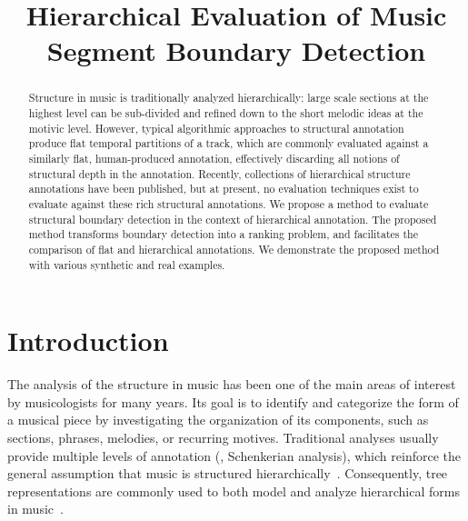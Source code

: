 \documentclass{article}
\title{Hierarchical Evaluation of Music Segment Boundary Detection}
\begin{document}
%
\maketitle
%
\begin{abstract}
Structure in music is traditionally analyzed hierarchically: large scale sections at the highest level can be sub-divided and refined down to the short melodic ideas at the motivic level. 
However, typical algorithmic approaches to structural annotation produce flat temporal partitions of a track, which are commonly evaluated against a similarly flat, human-produced
annotation, effectively discarding all notions of structural depth in the annotation.
Recently, collections of hierarchical structure annotations have been published, but at present, no evaluation techniques exist to evaluate against these rich structural annotations.
We propose a method to evaluate structural boundary detection in the context of hierarchical annotation.
The proposed method transforms boundary detection into a ranking problem, and facilitates the comparison of flat and hierarchical annotations.
We demonstrate the proposed method with various synthetic and real examples. 
\end{abstract}
%
\section{Introduction}\label{sec:introduction}

The analysis of the structure in music has been one of the main areas of interest by musicologists for many years.
Its goal is to identify and categorize the form of a musical piece by investigating the organization of its components, such as sections, phrases, melodies, or recurring motives.
Traditional analyses usually provide multiple levels of annotation (\eg, Schenkerian analysis), which reinforce the general assumption that music is structured hierarchically~\cite{Lerdahl1983a}.
Consequently, tree representations are commonly used to both model and analyze hierarchical forms in music~\cite{Lerdahl1983}.
\end{document}
